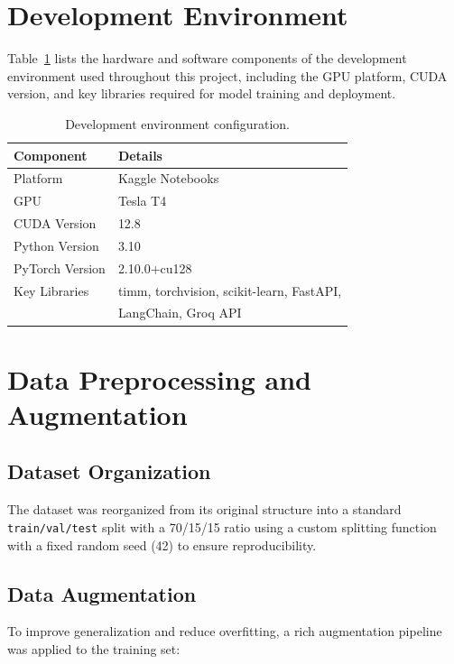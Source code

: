 \documentclass[12pt]{report}
\begin{document}
\section{Development Environment}

Table~\ref{tab:environment} lists the hardware and software components of the development environment used throughout this project, including the GPU platform, CUDA version, and key libraries required for model training and deployment.

\begin{table}[h]
\centering
\caption{Development environment configuration.}
\label{tab:environment}
\begin{tabular}{ll}
\hline
\textbf{Component}    & \textbf{Details} \\
\hline
Platform              & Kaggle Notebooks \\
GPU                   & Tesla T4 \\
CUDA Version          & 12.8 \\
Python Version        & 3.10 \\
PyTorch Version       & 2.10.0+cu128 \\
Key Libraries         & timm, torchvision, scikit-learn, FastAPI, \\
                      & LangChain, Groq API \\
\hline
\end{tabular}
\end{table}

\section{Data Preprocessing and Augmentation}

\subsection{Dataset Organization}
The dataset was reorganized from its original structure into a standard
\texttt{train/val/test} split with a 70/15/15 ratio using a custom
splitting function with a fixed random seed (42) to ensure reproducibility.

\subsection{Data Augmentation}
To improve generalization and reduce overfitting, a rich augmentation
pipeline was applied to the training set:
\end{document}
